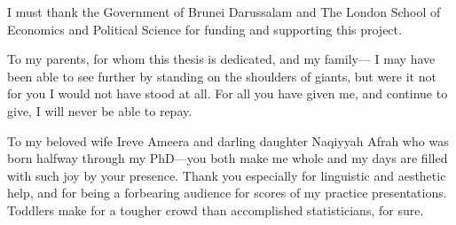 \documentclass[11pt,twoside,openright,showframe]{report}
\begin{document}
I must thank the Government of Brunei Darussalam and The London School of Economics and Political Science for funding and supporting this project.

To my parents, for whom this thesis is dedicated, and my family---
I may have been able to see further by standing on the shoulders of giants, but were it not for you I would not have stood at all.
For all you have given me, and continue to give, I will never be able to repay.

To my beloved wife Ireve Ameera and darling daughter Naqiyyah Afrah who was born halfway through my PhD---you both make me whole and my days are filled with such joy by your presence.
Thank you especially for linguistic and aesthetic help, and for being a forbearing audience for scores of my practice presentations.
Toddlers make for a tougher crowd than accomplished statisticians, for sure.

\end{document}
